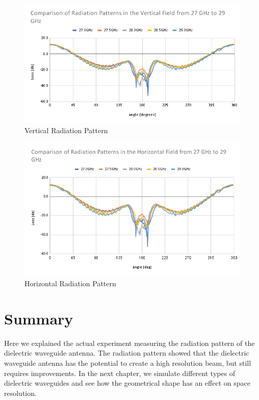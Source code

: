\documentclass[a4paper,12pt]{report}
\begin{document}
\begin{figure}
  \begin{center}
    \includegraphics[clip, keepaspectratio, width=0.9\linewidth]{img/radiation_pattern_comparison_27_29_vertical.png}
    \caption{Vertical Radiation Pattern}
    \label{fig:radiation_pattern_comparison_27_29_vertical} 
  \end{center}
\end{figure}

\begin{figure}
  \begin{center}
    \includegraphics[clip, keepaspectratio, width=0.9\linewidth]{img/radiation_pattern_comparison_27_29_horizontal.png}
    \caption{Horizontal Radiation Pattern}
    \label{img:radiation_pattern_comparison_27_29_horizontal}
  \end{center}
\end{figure}


\section{Summary}

Here we explained the actual experiment measuring
the radiation pattern of the dielectric waveguide antenna.
The radiation pattern showed that the dielectric waveguide antenna
has the potential to create a high resolution beam,
but still requires improvements.
In the next chapter,
we simulate different types of dielectric waveguides
and see how the geometrical shape has an effect on space resolution.
\end{document}
